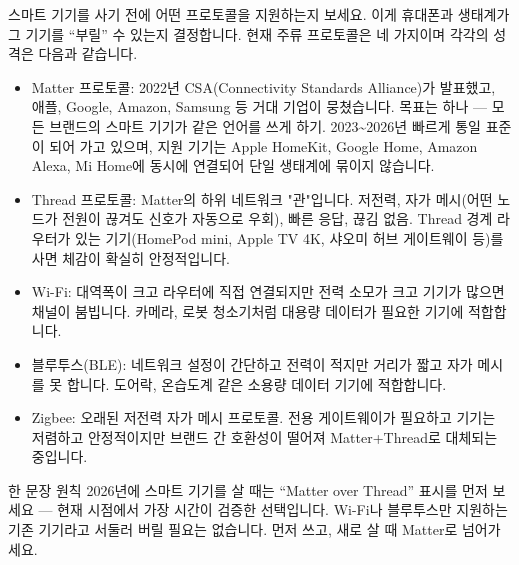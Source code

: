 


스마트 기기를 사기 전에 어떤 프로토콜을 지원하는지 보세요. 이게 휴대폰과 생태계가 그 기기를 “부릴” 수 있는지 결정합니다. 현재 주류 프로토콜은 네 가지이며 각각의 성격은 다음과 같습니다.

\begin{itemize}
  \item Matter 프로토콜: 2022년 CSA(Connectivity Standards Alliance)가 발표했고, 애플, Google, Amazon, Samsung 등 거대 기업이 뭉쳤습니다. 목표는 하나 — 모든 브랜드의 스마트 기기가 같은 언어를 쓰게 하기. 2023\textasciitilde{}2026년 빠르게 통일 표준이 되어 가고 있으며, 지원 기기는 Apple HomeKit, Google Home, Amazon Alexa, Mi Home에 동시에 연결되어 단일 생태계에 묶이지 않습니다.
  \item Thread 프로토콜: Matter의 하위 네트워크 "관"입니다. 저전력, 자가 메시(어떤 노드가 전원이 끊겨도 신호가 자동으로 우회), 빠른 응답, 끊김 없음. Thread 경계 라우터가 있는 기기(HomePod mini, Apple TV 4K, 샤오미 허브 게이트웨이 등)를 사면 체감이 확실히 안정적입니다.
  \item Wi-Fi: 대역폭이 크고 라우터에 직접 연결되지만 전력 소모가 크고 기기가 많으면 채널이 붐빕니다. 카메라, 로봇 청소기처럼 대용량 데이터가 필요한 기기에 적합합니다.
  \item 블루투스(BLE): 네트워크 설정이 간단하고 전력이 적지만 거리가 짧고 자가 메시를 못 합니다. 도어락, 온습도계 같은 소용량 데이터 기기에 적합합니다.
  \item Zigbee: 오래된 저전력 자가 메시 프로토콜. 전용 게이트웨이가 필요하고 기기는 저렴하고 안정적이지만 브랜드 간 호환성이 떨어져 Matter+Thread로 대체되는 중입니다.
\end{itemize}

\begin{tcbinfo}{한 문장 원칙}
2026년에 스마트 기기를 살 때는 “Matter over Thread” 표시를 먼저 보세요 — 현재 시점에서 가장 시간이 검증한 선택입니다. Wi-Fi나 블루투스만 지원하는 기존 기기라고 서둘러 버릴 필요는 없습니다. 먼저 쓰고, 새로 살 때 Matter로 넘어가세요.

\end{tcbinfo}

